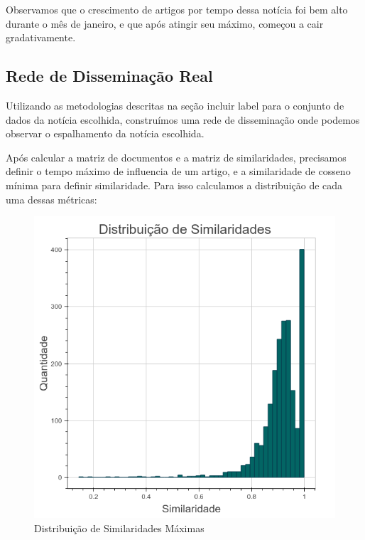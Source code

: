 \documentclass[a4paper,12pt]{article}
\begin{document}
Observamos que o crescimento de artigos por tempo dessa notícia foi bem alto durante o mês de janeiro, e que após atingir seu máximo, começou
a cair gradativamente.

\subsection{Rede de Disseminação Real}

Utilizando as metodologias descritas na seção {incluir label} para o conjunto de dados da notícia escolhida, construímos uma rede de disseminação
onde podemos observar o espalhamento da notícia escolhida.

Após calcular a matriz de documentos e a matriz de similaridades, precisamos definir o tempo máximo de influencia de um artigo, e a similaridade de cosseno
mínima para definir similaridade. Para isso calculamos a distribuição de cada uma dessas métricas:

\begin{figure}[h]
 \centering
 \includegraphics[scale=0.4]{./2.png}
 \caption{Distribuição de Similaridades Máximas}
\end{figure}
\end{document}
